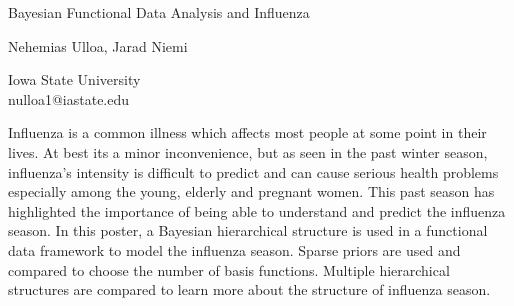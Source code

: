 \documentclass[a4paper]{article}
\begin{document}

\Large
 \begin{center}
Bayesian Functional Data Analysis and Influenza\\ 

\hspace{10pt}

\large
Nehemias Ulloa, Jarad Niemi \\%

\hspace{10pt}

\small  
Iowa State University\\
nulloa1@iastate.edu\\

\end{center}

\hspace{10pt}

\normalsize

Influenza is a common illness which affects most people at some point in their lives. At best its a minor inconvenience, but as seen in the past winter season, influenza's intensity is difficult to predict and can cause serious health problems especially among the young, elderly and pregnant women. This past season has highlighted the importance of being able to understand and predict the influenza season. In this poster, a Bayesian hierarchical structure is used in a functional data framework to model the influenza season. Sparse priors are used and compared to choose the number of basis functions. Multiple hierarchical structures are compared to learn more about the structure of influenza season.
\end{document}
